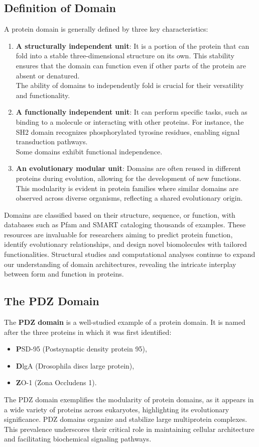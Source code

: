 \documentclass[English, Lau, oneside]{sapthesis}
\begin{document}
\subsection*{Definition of Domain}
\noindent A protein domain is generally defined by three key characteristics:\cite{ref8}
\begin{enumerate}
    \item \textbf{A structurally independent unit}: It is a portion of the protein that can fold into a stable three-dimensional structure on its own. This stability ensures that the domain can function even if other parts of the protein are absent or denatured. \\
    The ability of domains to independently fold is crucial for their versatility and functionality.
    \item \textbf{A functionally independent unit}: It can perform specific tasks, such as binding to a molecule or interacting with other proteins. For instance, the SH2 domain recognizes phosphorylated tyrosine residues, enabling signal transduction pathways.\\
    Some domains exhibit functional independence.
    \item \textbf{An evolutionary modular unit}: Domains are often reused in different proteins during evolution, allowing for the development of new functions. This modularity is evident in protein families where similar domains are observed across diverse organisms, reflecting a shared evolutionary origin. 
\end{enumerate}

Domains are classified based on their structure, sequence, or function, with databases such as Pfam and SMART cataloging thousands of examples.\cite{pfam} These resources are invaluable for researchers aiming to predict protein function, identify evolutionary relationships, and design novel biomolecules with tailored functionalities. Structural studies and computational analyses continue to expand our understanding of domain architectures, revealing the intricate interplay between form and function in proteins.

\subsection*{The PDZ Domain}
\noindent The \textbf{PDZ domain} is a well-studied example of a protein domain. It is named after the three proteins in which it was first identified:\cite{ref8}
\begin{itemize}
    \item \textbf{P}SD-95 (Postsynaptic density protein 95),
    \item \textbf{D}lgA (Drosophila discs large protein),
    \item \textbf{Z}O-1 (Zona Occludens 1).
\end{itemize}
The PDZ domain exemplifies the modularity of protein domains, as it appears in a wide variety of proteins across eukaryotes, highlighting its evolutionary significance. PDZ domains organize and stabilize large multiprotein complexes. This prevalence underscores their critical role in maintaining cellular architecture and facilitating biochemical signaling pathways.
\end{document}
